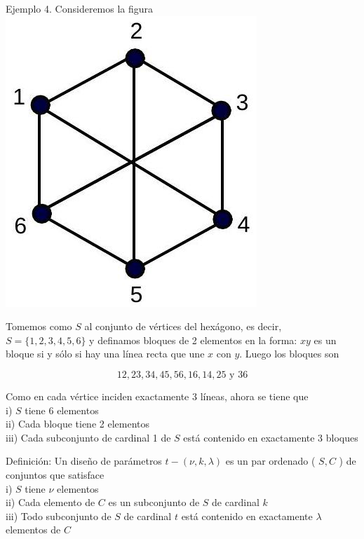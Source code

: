 \documentclass[10pt]{article}
\begin{document}
Ejemplo 4. Consideremos la figura\\
\includegraphics[max width=\textwidth, center]{2025_09_05_76a00afb34b0e185ce5bg-14}

Tomemos como $S$ al conjunto de vértices del hexágono, es decir, $S=\{1,2,3,4,5,6\}$ y definamos bloques de 2 elementos en la forma: $x y$ es un bloque si y sólo si hay una línea recta que une $x$ con $y$. Luego los bloques son

$$
12,23,34,45,56,16,14,25 \text { y } 36
$$

Como en cada vértice inciden exactamente 3 líneas, ahora se tiene que\\
i) $S$ tiene 6 elementos\\
ii) Cada bloque tiene 2 elementos\\
iii) Cada subconjunto de cardinal 1 de $S$ está contenido en exactamente 3 bloques

Definición: Un diseño de parámetros $t-(\nu, k, \lambda)$ es un par ordenado ( $S, C$ ) de conjuntos que satisface\\
i) $S$ tiene $\nu$ elementos\\
ii) Cada elemento de $C$ es un subconjunto de $S$ de cardinal $k$\\
iii) Todo subconjunto de $S$ de cardinal $t$ está contenido en exactamente $\lambda$ elementos de $C$
\end{document}
